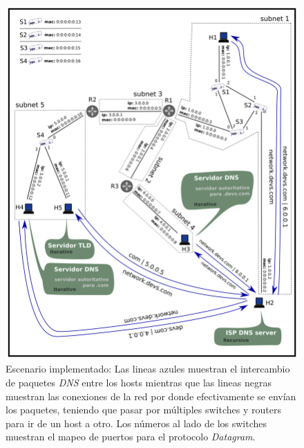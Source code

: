 \documentclass[10pt,a4paper]{article}
\begin{document}
\newpage

\begin{figure}[!htb]
    \centering
    \includegraphics[width = 1.0\textwidth]{img/png/scenario.png}
    \caption{Escenario implementado: Las lineas azules muestran el intercambio de paquetes \textit{DNS} entre los hosts mientras que las lineas negras muestran las conexiones de la red por donde efectivamente se envían los paquetes, teniendo que pasar por múltiples switches y routers para ir de un host a otro. Los números al lado de los switches muestran el mapeo de puertos para el protocolo \textit{Datagram}.}
    \label{figure: case study}
\end{figure}

\newpage
\end{document}
